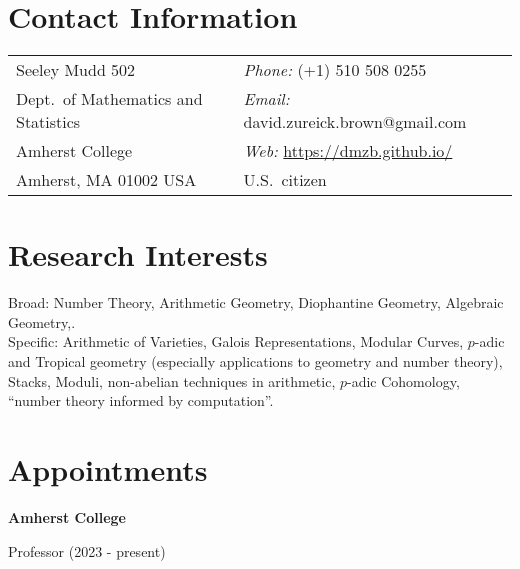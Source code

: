 \documentclass[margin,line]{res}
\newcommand{\defi}[1]{\textsf{#1}} 				%
\newenvironment{list1}{
  \begin{list}{\ding{113}}{%
      \setlength{\itemsep}{0in}
      \setlength{\parsep}{0in} \setlength{\parskip}{0in}
      \setlength{\topsep}{0in} \setlength{\partopsep}{0in}
      \setlength{\leftmargin}{0.17in}}}{\end{list}}
\begin{document}

\begin{resume}
\section{\sc Contact Information}
\vspace{.05in}
\begin{tabular}{@{}p{3in}p{4in}}
Seeley Mudd 502                            & \emph{Phone:} (+1) 510 508 0255 \\
Dept.~of Mathematics and Statistics          & \emph{Email:} david.zureick.brown@gmail.com\\
Amherst College   & \emph{Web:} \url{https://dmzb.github.io/} \\
Amherst, MA 01002 USA               & U.S.~citizen
\end{tabular}



\section{\sc Research Interests}
 \defi{Broad}: Number Theory, Arithmetic Geometry, Diophantine Geometry, Algebraic Geometry,.\\
 \defi{Specific}: Arithmetic of Varieties, Galois Representations, Modular Curves, $p$-adic and Tropical geometry (especially applications to geometry and number theory), Stacks, Moduli, non-abelian techniques in arithmetic, $p$-adic Cohomology, ``number theory informed by computation''.

\section{\sc Appointments}

{\bf Amherst College } \\
  \vspace*{-.15in}
  \begin{list1}
  \item[] Professor (2023 - present)


  \end{list1}
\vspace{-7pt}


\end{resume}
\end{document}
